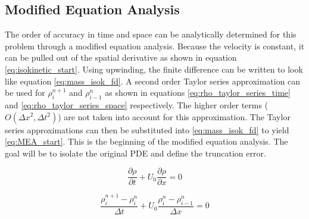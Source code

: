 \documentclass{mc2015}
\begin{document}
%
%

\subsection{Modified Equation Analysis}
    
    The order of accuracy in time and space can be analytically determined for
    this problem through a modified equation analysis. Because the velocity is
    constant, it can be pulled out of the spatial derivative as shown in
    equation \ref{eq:isokinetic_start}. Using upwinding, the finite difference
    can be written to look like equation \ref{eq:mass_isok_fd}.  A second order
    Taylor series approximation can  be used for $\rho_{i}^{n+1}$  and
    $\rho_{i-1}^{n}$ as shown in equations \ref{eq:rho_taylor_series_time} and
    \ref{eq:rho_taylor_series_space} respectively. The higher order terms
    ($O(\Delta x^{2},\Delta t^{2} )$) are not taken into account for this
    approximation. The Taylor series approximations can then be substituted into
    \ref{eq:mass_isok_fd} to yield \ref{eq:MEA_start}. This is the beginning of
    the modified equation analysis. The goal will be to isolate the original PDE
    and define the truncation error.
    
    \begin{equation}
    	\label{eq:isokinetic_start}
    	\frac{\partial \rho}{\partial t} + U_{0} \frac{\partial \rho}{\partial x} = 0
    \end{equation}
    
    \begin{equation}
    	\label{eq:mass_isok_fd}
    	\frac{ \rho_{i}^{n+1} - \rho_{i}^{n} }{\Delta t} 
    	+ U_{0} \frac{\rho_{i}^{n} - \rho_{i-1}^{n}}{\Delta x} = 0
    \end{equation}
    
\end{document}
